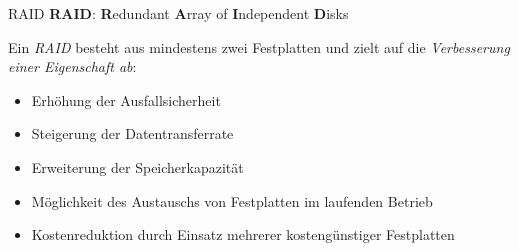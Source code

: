 \documentclass[german]{spicker}
\begin{document}
\begin{defi}{RAID}
    \textbf{RAID}: \textbf{R}edundant \textbf{A}rray of \textbf{I}ndependent \textbf{D}isks

    Ein \emph{RAID} besteht aus mindestens zwei Festplatten und zielt auf die \emph{Verbesserung einer Eigenschaft ab}:
    \begin{itemize}
        \item Erhöhung der Ausfallsicherheit
        \item Steigerung der Datentransferrate
        \item Erweiterung der Speicherkapazität
        \item Möglichkeit des Austauschs von Festplatten im laufenden Betrieb
        \item Kostenreduktion durch Einsatz mehrerer kostengünstiger Festplatten
    \end{itemize}
\end{defi}
\end{document}
